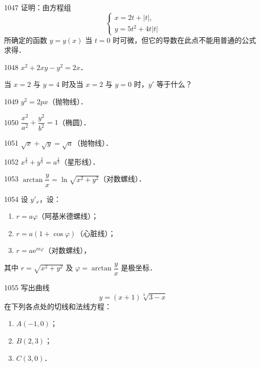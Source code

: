 \begin{prob}[M]{1047}
证明：由方程组
\[
\begin{cases}
x = 2t + |t|, \\
y = 5t^2 + 4t|t|
\end{cases}
\]
所确定的函数 $y = y(x)$ 当 $t = 0$ 时可微，但它的导数在此点不能用普通的公式求得．
\end{prob}


\begin{prob}[M]{1048}
$x^2 + 2xy - y^2 = 2x$．

当 $x = 2$ 与 $y = 4$ 时及当 $x = 2$ 与 $y = 0$ 时，$y'$ 等于什么？
\end{prob}

\begin{prob}[S]{1049}
$y^2 = 2px$（抛物线）．
\end{prob}

\begin{prob}[S]{1050}
$\dfrac{x^2}{a^2} + \dfrac{y^2}{b^2} = 1$（椭圆）．
\end{prob}

\begin{prob}[S]{1051}
$\sqrt{x} + \sqrt{y} = \sqrt{a}$（抛物线）．
\end{prob}

\begin{prob}[S]{1052}
$x^{\frac{2}{3}} + y^{\frac{2}{3}} = a^{\frac{2}{3}}$（星形线）．
\end{prob}

\begin{prob}[S]{1053}
$\arctan \dfrac{y}{x} = \ln \sqrt{x^2 + y^2}$（对数螺线）．
\end{prob}

\begin{prob}[L]{1054}
设 $y'_x$，设：
\begin{enumerate}[label=(\alph*), itemsep=2pt, topsep=3pt]
  \item $r = a\varphi$（阿基米德螺线）；
  \item $r = a(1 + \cos\varphi)$（心脏线）；
  \item $r = a\mathrm{e}^{m\varphi}$（对数螺线），
\end{enumerate}
其中 $r = \sqrt{x^2 + y^2}$ 及 $\varphi = \arctan \dfrac{y}{x}$ 是极坐标．
\end{prob}


\begin{prob}[L]{1055}
写出曲线
\[
y = (x + 1)\sqrt[3]{3 - x}
\]
在下列各点处的切线和法线方程：
\begin{enumerate}[label=(\alph*), itemsep=2pt, topsep=3pt]
  \item $A(-1, 0)$；
  \item $B(2, 3)$；
  \item $C(3, 0)$．
\end{enumerate}
\end{prob}

